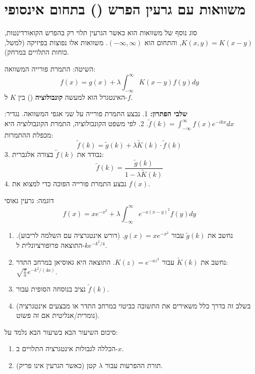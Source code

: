 \section{משוואות עם גרעין הפרש () בתחום אינסופי}

סוג נוסף של משוואות הוא כאשר הגרעין תלוי רק בהפרש הקואורדינטות, $K(x,y) = K(x-y)$, והתחום הוא $(-\infty, \infty)$. משוואות אלו נפוצות בפיזיקה (למשל, כוחות התלויים במרחק).

\begin{mainbox}{השיטה: התמרת פורייה}
המשוואה:
$$ f(x) = g(x) + \lambda \int_{-\infty}^{\infty} K(x-y)f(y) dy $$
האינטגרל הוא למעשה \textbf{קונבולוציה} () בין $K$ ל-$f$.

\textbf{שלבי הפתרון:}
1. נבצע התמרת פורייה על שני אגפי המשוואה. נגדיר: $\tilde{f}(k) = \int_{-\infty}^{\infty} f(x) e^{-ikx} dx$.
2. לפי משפט הקונבולוציה, התמרת הקונבולוציה היא מכפלת ההתמרות:
$$ \tilde{f}(k) = \tilde{g}(k) + \lambda \tilde{K}(k) \cdot \tilde{f}(k) $$
3. נבודד את $\tilde{f}(k)$ בצורה אלגברית:
$$ \tilde{f}(k) = \frac{\tilde{g}(k)}{1 - \lambda \tilde{K}(k)} $$
4. נבצע התמרת פורייה הפוכה כדי למצוא את $f(x)$.
\end{mainbox}

\begin{examplebox}{דוגמה: גרעין גאוסי}
$$ f(x) = x e^{-x^2} + \lambda \int_{-\infty}^{\infty} e^{-a(x-y)^2} f(y) dy $$
\begin{enumerate}
    \item נחשב את $\tilde{g}(k)$ עבור $g(x) = x e^{-x^2}$. (דורש אינטגרציה עם השלמה לריבוע). התוצאה פרופורציונלית ל-$k e^{-k^2/4}$.
    \item נחשב את $\tilde{K}(k)$ עבור $K(z) = e^{-az^2}$. התוצאה היא גאוסיאן במרחב התדר: $\sqrt{\frac{\pi}{a}} e^{-k^2/(4a)}$.
    \item נציב בנוסחה הסופית עבור $\tilde{f}(k)$.
    \item (בשלב זה בדרך כלל משאירים את התשובה כביטוי במרחב התדר או מבצעים אינטגרציה נומרית/אנליטית אם זה פשוט).
\end{enumerate}
\end{examplebox}

\begin{summarybox}{סיכום השיעור הבא}
בשיעור הבא נלמד על:
\begin{enumerate}
    \item הכללה לגבולות אינטגרציה התלויים ב-$x$.
    \item תורת ההפרעות עבור $\lambda$ קטן (כאשר הגרעין אינו פריק).
\end{enumerate}
\end{summarybox}